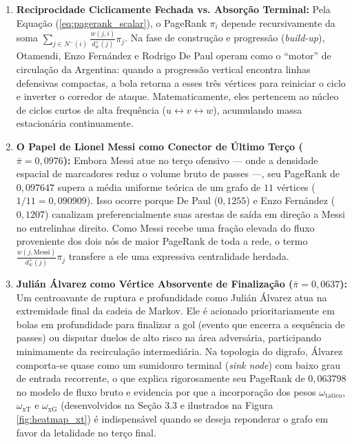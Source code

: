 \documentclass[10pt,a4paper]{article}
\theoremstyle{definition}
\theoremstyle{plain}
\theoremstyle{remark}
\begin{document}
\begin{enumerate}
    \item \textbf{Reciprocidade Ciclicamente Fechada vs. Absorção Terminal:} Pela Equação (\ref{eq:pagerank_scalar}), o PageRank $\pi_i$ depende recursivamente da soma $\sum_{j \in N^{-}(i)} \frac{w(j, i)}{d^{+}_{w}(j)} \pi_j$. Na fase de construção e progressão (\textit{build-up}), Otamendi, Enzo Fernández e Rodrigo De Paul operam como o ``motor'' de circulação da Argentina: quando a progressão vertical encontra linhas defensivas compactas, a bola retorna a esses três vértices para reiniciar o ciclo e inverter o corredor de ataque. Matematicamente, eles pertencem ao núcleo de ciclos curtos de alta frequência ($u \leftrightarrow v \leftrightarrow w$), acumulando massa estacionária continuamente.
    \item \textbf{O Papel de Lionel Messi como Conector de Último Terço ($\bar{\pi} = 0{,}0976$):} Embora Messi atue no terço ofensivo --- onde a densidade espacial de marcadores reduz o volume bruto de passes ---, seu PageRank de $0{,}097647$ supera a média uniforme teórica de um grafo de $11$ vértices ($1/11 = 0{,}090909$). Isso ocorre porque De Paul ($0{,}1255$) e Enzo Fernández ($0{,}1207$) canalizam preferencialmente suas arestas de saída em direção a Messi no entrelinhas direito. Como Messi recebe uma fração elevada do fluxo proveniente dos dois nós de maior PageRank de toda a rede, o termo $\frac{w(j, \text{Messi})}{d^{+}_{w}(j)} \pi_j$ transfere a ele uma expressiva centralidade herdada.
    \item \textbf{Julián Álvarez como Vértice Absorvente de Finalização ($\bar{\pi} = 0{,}0637$):} Um centroavante de ruptura e profundidade como Julián Álvarez atua na extremidade final da cadeia de Markov. Ele é acionado prioritariamente em bolas em profundidade para finalizar a gol (evento que encerra a sequência de passes) ou disputar duelos de alto risco na área adversária, participando minimamente da recirculação intermediária. Na topologia do digrafo, Álvarez comporta-se quase como um sumidouro terminal (\textit{sink node}) com baixo grau de entrada recorrente, o que explica rigorosamente seu PageRank de $0{,}063798$ no modelo de fluxo bruto e evidencia por que a incorporação dos pesos $\omega_{\text{tatico}}$, $\omega_{\text{xT}}$ e $\omega_{\text{xG}}$ (desenvolvidos na Seção 3.3 e ilustrados na Figura \ref{fig:heatmap_xt}) é indispensável quando se deseja reponderar o grafo em favor da letalidade no terço final.
\end{enumerate}
\end{document}
